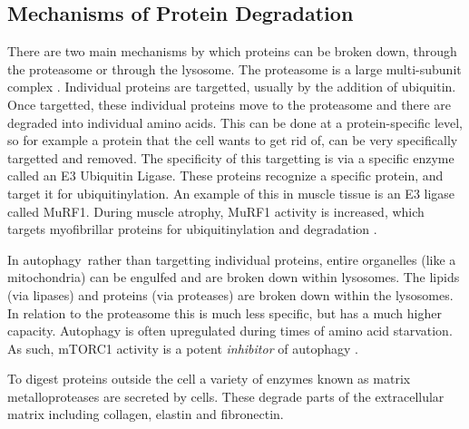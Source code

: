 \documentclass{tufte-handout}
\begin{document}
\subsection{Mechanisms of Protein Degradation}

There are two main mechanisms by which proteins can be broken down, through the proteasome or through the lysosome.  The proteasome is a large multi-subunit complex \citep{Finley2009}.  Individual proteins are targetted, usually by the addition of ubiquitin. Once targetted, these individual proteins move to the proteasome and there are degraded into individual amino acids.  This can be done at a protein-specific level, so for example a protein that the cell wants to get rid of, can be very specifically targetted and removed. The specificity of this targetting is via a specific enzyme called an E3 Ubiquitin Ligase.  These proteins recognize a specific protein, and target it for ubiquitinylation. An example of this in muscle tissue is an E3 ligase called MuRF1.  During muscle atrophy, MuRF1 activity is increased, which targets myofibrillar proteins for ubiquitinylation and degradation \citep{Bodine2014}.  

  In autophagy\, rather than targetting individual proteins, entire organelles (like a mitochondria) can be engulfed and are broken down within lysosomes.  The lipids (via lipases) and proteins (via proteases) are broken down within the lysosomes.  In relation to the proteasome this is much less specific, but has a much higher capacity.  Autophagy is often upregulated during times of amino acid starvation.  As such, mTORC1 activity is a potent \emph{inhibitor} of autophagy \citep{Noda1998}.

  To digest proteins outside the cell a variety of enzymes known as matrix metalloproteases are secreted by cells.  These degrade parts of the extracellular matrix including collagen, elastin and fibronectin.
\end{document}
